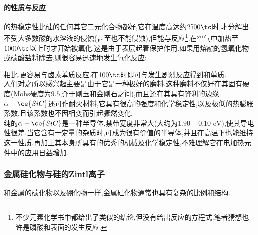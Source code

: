 \documentclass{ctexart}
\begin{document}
\paragraph{的性质与反应}
的热稳定性比硅的任何其它二元化合物都好,它在温度高达约$2700\tc$时,才分解出.不受大多数酸的水溶液的侵蚀(甚至也不能侵蚀),但能与反应\footnote{不少元素化学书中都给出了类似的结论,但没有给出反应的方程式.笔者猜想也许是磷酸和表面的发生反应.}.在空气中加热至$1000\tc$以上时才开始被氧化.这是由于表层起着保护作用.如果用熔融的氢氧化物或碳酸盐将除去,则很容易迅速地发生氧化反应:
\begin{center}
\end{center}
相比,更容易与卤素单质反应.在$100\tc$时即可与发生剧烈反应得到和单质.\\
\indent 人们对之所以感兴趣主要是由于它是一种极好的磨料.这种磨料不仅好在其固有硬度(Mohs硬度为$9.5$,介于刚玉和金刚石之间),而且还在其具有锋利的边缘.$\alpha-\ce{SiC}$还可作耐火材料,它具有很高的强度和化学稳定性,以及极低的热膨胀系数,且该系数也不因相变而引起骤然变化.\\
\indent 纯的$\alpha-\ce{SiC}$是一种半导体,禁带宽度非常大(大约为$1.90\pm0.10\text{ eV}$),使其导电性很差.当它含有一定量的杂质时,可成为很有价值的半导体,并且在高温下也能维持这一性质.再加上其本身所具有的优秀的机械及化学稳定性,不难理解它在电加热元件中的应用日益增加.
\subsubsection{金属硅化物与硅的Zintl离子}
和金属的碳化物以及硼化物一样,金属硅化物通常也具有复杂的比例和结构.
\end{document}
